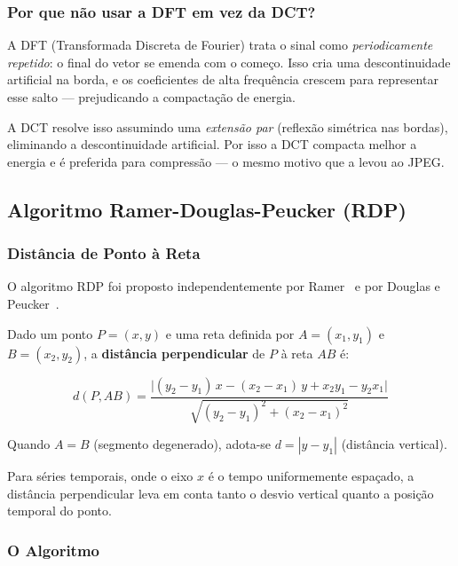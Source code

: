 \documentclass[12pt, a4paper]{article}
\begin{document}
\subsubsection{Por que não usar a DFT em vez da DCT?}

A DFT (Transformada Discreta de Fourier) trata o sinal como \emph{periodicamente repetido}: o final do vetor se emenda com o começo. Isso cria uma descontinuidade artificial na borda, e os coeficientes de alta frequência crescem para representar esse salto — prejudicando a compactação de energia.

A DCT resolve isso assumindo uma \emph{extensão par} (reflexão simétrica nas bordas), eliminando a descontinuidade artificial. Por isso a DCT compacta melhor a energia e é preferida para compressão — o mesmo motivo que a levou ao JPEG.

\subsection{Algoritmo Ramer-Douglas-Peucker (RDP)}

\subsubsection{Distância de Ponto à Reta}

O algoritmo RDP foi proposto independentemente por Ramer~\cite{ramer1972iterative} e por Douglas e Peucker~\cite{douglas1973algorithms}.

Dado um ponto $P = (x, y)$ e uma reta definida por $A = (x_1, y_1)$ e $B = (x_2, y_2)$, a \textbf{distância perpendicular} de $P$ à reta $AB$ é:

\begin{equation}
    d(P, AB) =
    \frac{\bigl|(y_2 - y_1)\,x - (x_2 - x_1)\,y + x_2 y_1 - y_2 x_1\bigr|}
         {\sqrt{(y_2-y_1)^2 + (x_2-x_1)^2}}
\end{equation}

Quando $A = B$ (segmento degenerado), adota-se $d = |y - y_1|$ (distância vertical).

Para séries temporais, onde o eixo $x$ é o tempo uniformemente espaçado, a distância perpendicular leva em conta tanto o desvio vertical quanto a posição temporal do ponto.

\subsubsection{O Algoritmo}
\end{document}
